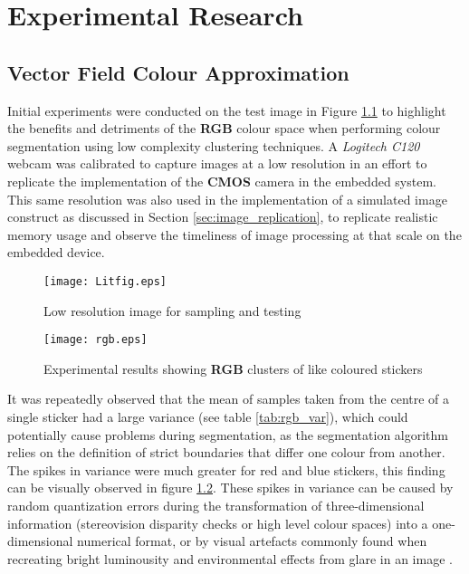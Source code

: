 \documentclass[11pt, a4paper, oneside]{Thesis} %
\begin{document}
\chapter{Experimental Research} %
\label{chap:research} %


\section{Vector Field Colour Approximation}\label{sec:vector}
Initial experiments were conducted on the test image in Figure \ref{fig:litfig} to highlight the benefits and detriments of the \textbf{RGB} colour space when performing colour segmentation using low complexity clustering techniques. A \emph{Logitech C120} webcam was calibrated to capture images at a low resolution in an effort to replicate the implementation of the \textbf{CMOS} camera in the embedded system. This same resolution was also used in the implementation of a simulated image construct as discussed in Section \ref{sec:image_replication}, to replicate realistic memory usage and observe the timeliness of image processing at that scale on the embedded device.

\begin{figure}[h]
  \begin{center}
    \texttt{[image: Litfig.eps]}
  \end{center}
  \caption{Low resolution image for sampling and testing}
  \label{fig:litfig}
\end{figure}

\begin{figure}[h]
  \begin{center}
    \texttt{[image: rgb.eps]}
  \end{center}
  \caption{Experimental results showing \textbf{RGB} clusters of like coloured stickers}
  \label{fig:rgbtest}
\end{figure}

It was repeatedly observed that the mean of samples taken from the centre of a single sticker had a large variance (see table \ref{tab:rgb_var}), which could potentially cause problems during segmentation, as the segmentation algorithm relies on the definition of strict boundaries that differ one colour from another. The spikes in variance were much greater for red and blue stickers, this finding can be visually observed in figure \ref{fig:rgbtest}. These spikes in variance can be caused by random quantization errors during the transformation of three-dimensional information (stereovision disparity checks or high level colour spaces) into a one-dimensional numerical format, or by visual artefacts commonly found when recreating bright luminousity and environmental effects from glare in an image \cite{mccann2007camera}. 
\end{document}
